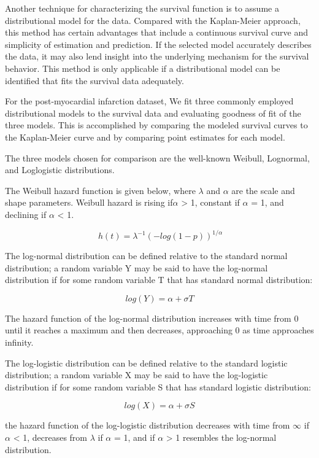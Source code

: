 \documentclass[
]{article}
\begin{document}
Another technique for characterizing the survival function is to assume
a distributional model for the data. Compared with the Kaplan-Meier
approach, this method has certain advantages that include a continuous
survival curve and simplicity of estimation and prediction. If the
selected model accurately describes the data, it may also lend insight
into the underlying mechanism for the survival behavior. This method is
only applicable if a distributional model can be identified that fits
the survival data adequately.

For the post-myocardial infarction dataset, We fit three commonly
employed distributional models to the survival data and evaluating
goodness of fit of the three models. This is accomplished by comparing
the modeled survival curves to the Kaplan-Meier curve and by comparing
point estimates for each model.

The three models chosen for comparison are the well-known Weibull,
Lognormal, and Loglogistic distributions.

The Weibull hazard function is given below, where \(\lambda\) and
\(\alpha\) are the scale and shape parameters. Weibull hazard is rising
if\(\alpha\) \textgreater{} 1, constant if \(\alpha\) = 1, and declining
if \(\alpha\) \textless{} 1.

\[ \ h(t) = {\lambda}^{-1}{(-log(1-p))}^{1/\alpha} \]

The log-normal distribution can be defined relative to the standard
normal distribution; a random variable Y may be said to have the
log-normal distribution if for some random variable T that has standard
normal distribution:

\[ log (Y) = \alpha + \sigma{T} \]

The hazard function of the log-normal distribution increases with time
from 0 until it reaches a maximum and then decreases, approaching 0 as
time approaches infinity.

The log-logistic distribution can be defined relative to the standard
logistic distribution; a random variable X may be said to have the
log-logistic distribution if for some random variable S that has
standard logistic distribution:

\[ log (X) = \alpha + \sigma{S} \]

the hazard function of the log-logistic distribution decreases with time
from \(\infty\) if \(\alpha\) \textless{} 1, decreases from \(\lambda\)
if \(\alpha\) = 1, and if \(\alpha\) \textgreater{} 1 resembles the
log-normal distribution.
\end{document}

